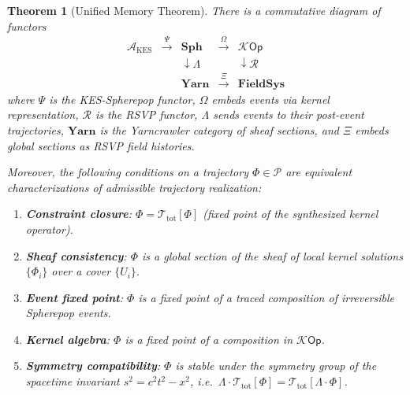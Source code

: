 \documentclass[12pt]{article}
\newtheorem{theorem}{Theorem}[section]
\newcommand{\Pcal}{\mathcal{P}}
\newcommand{\Kcal}{\mathcal{K}}
\begin{document}
\begin{theorem}[Unified Memory Theorem]
\label{thm:unified}
There is a commutative diagram of functors
\[
\begin{array}{ccccc}
  \mathcal{A}_{\mathrm{KES}}
    & \xrightarrow{\;\Psi\;}
  & \mathbf{Sph}
    & \xrightarrow{\;\Omega\;}
  & \Kcal\mathsf{Op} \\
  & & \downarrow\scriptstyle{\Lambda}
    & & \downarrow\scriptstyle{\mathcal{R}} \\
  & & \mathbf{Yarn}
    & \xrightarrow{\;\Xi\;}
  & \mathbf{FieldSys}
\end{array}
\]
where $\Psi$ is the KES-Spherepop functor, $\Omega$ embeds events via
kernel representation, $\mathcal{R}$ is the RSVP functor, $\Lambda$ sends
events to their post-event trajectories, $\mathbf{Yarn}$ is the Yarncrawler
category of sheaf sections, and $\Xi$ embeds global sections as RSVP field
histories.

Moreover, the following conditions on a trajectory $\Phi \in \Pcal$ are
equivalent characterizations of admissible trajectory realization:
\begin{enumerate}[label=(\roman*)]
  \item \textbf{Constraint closure}: $\Phi = \mathcal{T}_{\mathrm{tot}}[\Phi]$
    (fixed point of the synthesized kernel operator).
  \item \textbf{Sheaf consistency}: $\Phi$ is a global section of the sheaf
    of local kernel solutions $\{\Phi_i\}$ over a cover $\{U_i\}$.
  \item \textbf{Event fixed point}: $\Phi$ is a fixed point of a traced
    composition of irreversible Spherepop events.
  \item \textbf{Kernel algebra}: $\Phi$ is a fixed point of a composition
    in $\Kcal\mathsf{Op}$.
  \item \textbf{Symmetry compatibility}: $\Phi$ is stable under the symmetry
    group of the spacetime invariant $s^2 = c^2t^2 - x^2$, i.e.\
    $\Lambda\cdot\mathcal{T}_{\mathrm{tot}}[\Phi] =
    \mathcal{T}_{\mathrm{tot}}[\Lambda\cdot\Phi]$.
\end{enumerate}


\end{theorem}
\end{document}
